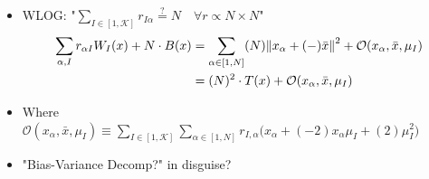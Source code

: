 \begin{frame} [t]
\begin{itemize}
    \item WLOG: 
        $ \text {"}
          \sum _{I\in[1,\mathscr{K}]} r_{I \alpha} 
          \overset {?} {=} N 
          \quad \forall 
          r \propto N \times N 
          \text {"}
        $ 
        { \footnotesize
        \begin{align*}
            \sum _{\alpha, I} 
                r _{\alpha I} W _{I} (x)
              + N \cdot B (x) 
          & = 
             \sum _{\alpha \in [1,N]}
             (N)
             \norm 
               { x _{\alpha} 
                 + (-) \bar {x}  
               } ^{2}
              + \mathcal {O} 
                 ( x _{\alpha}, 
                   \bar {x}, \mu _{I} 
                 ) 
          \\ & = 
            (N)^{2} \cdot 
            T (x)
            + \mathcal {O} 
                 ( x _{\alpha}, 
                   \bar {x}, \mu _{I} 
                 ) 
        \end{align*}
        }
    \item 
        Where $ \mathcal {O} 
                 ( x _{\alpha}, 
                   \bar {x}, \mu _{I} 
                 ) 
                 \equiv 
                \sum 
                  _{I \in [1, \mathscr{K}]} 
                \sum 
                 _{\alpha \in [1,N]}
                 r _{I, \alpha} 
                 \big( 
                   x _{\alpha} 
                   + (-2) x _{\alpha} \mu _{I}
                   + (2) \mu _{I} ^{2} 
                 \big)
              $ 
    \item \red 
      {"Bias-Variance Decomp?" in disguise?}
\end{itemize}
\end{frame} 

